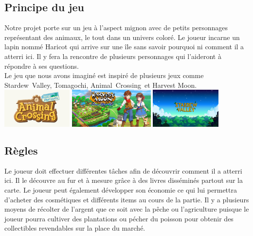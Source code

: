 \documentclass{article}
\begin{document}
\subsection{Principe du jeu}

Notre projet porte sur un jeu à l'aspect mignon avec de petits personnages représentant des animaux, le tout dans un univers coloré. Le joueur incarne un lapin nommé Haricot qui arrive sur une île sans savoir pourquoi ni comment il a atterri ici. Il y fera la rencontre de plusieurs personnages qui l'aideront à répondre à ses questions.\\ 

Le jeu que nous avons imaginé est inspiré de plusieurs jeux comme Stardew~Valley, Tomagochi, Animal~Crossing~et Harvest Moon.\\
\newline
\includegraphics[height = 2cm]{AClogo.png}
\hspace{7pt}
\includegraphics[height = 2cm]{HMlogo.jpg}
\hspace{7pt}
\includegraphics[height = 2cm]{SVlogo.jpeg}

\subsection{Règles}

Le joueur doit effectuer différentes tâches afin de découvrir comment il a atterri ici. Il le découvre au fur et à mesure grâce à des livres disséminés partout sur la carte. Le joueur peut également développer son économie ce qui lui permettra d'acheter des cosmétiques et différents items au cours de la partie. Il y a plusieurs moyens de récolter de l'argent que ce soit avec la pêche ou l'agriculture puisque le joueur pourra cultiver des plantations ou pécher du poisson pour obtenir des collectibles revendables sur la place du marché.
\\
\end{document}
